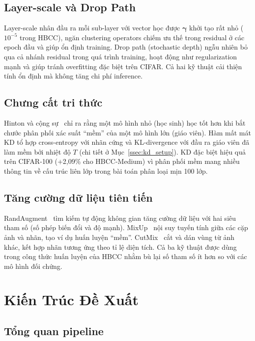 \documentclass[journal]{IEEEtran}
\begin{document}
\subsection{Layer-scale và Drop Path}

Layer-scale nhân đầu ra mỗi sub-layer với vector học được
$\bm{\gamma}$ khởi tạo rất nhỏ ($10^{-5}$ trong HBCC), ngăn
clustering operators chiếm ưu thế trong residual ở các epoch đầu và
giúp ổn định training. Drop path (stochastic depth) ngẫu nhiên bỏ
qua cả nhánh residual trong quá trình training, hoạt động như
regularization mạnh và giúp tránh overfitting đặc biệt trên CIFAR.
Cả hai kỹ thuật cải thiện tính ổn định mà không tăng chi phí
inference.

\subsection{Chưng cất tri thức}

Hinton và cộng sự~\cite{Hinton2015Distillation} chỉ ra rằng một mô
hình nhỏ (học sinh) học tốt hơn khi bắt chước phân phối xác suất
``mềm'' của một mô hình lớn (giáo viên). Hàm mất mát KD tổ hợp
cross-entropy với nhãn cứng và KL-divergence với đầu ra giáo viên đã
làm mềm bởi nhiệt độ $T$ (chi tiết ở Mục~\ref{ssec:kd_setup}).
KD đặc biệt hiệu quả trên CIFAR-100 ($+$2,09\% cho HBCC-Medium) vì
phân phối mềm mang nhiều thông tin về cấu trúc liên lớp trong bài
toán phân loại mịn 100 lớp.

\subsection{Tăng cường dữ liệu tiên tiến}

RandAugment~\cite{Cubuk2020RandAugment} tìm kiếm tự động không gian
tăng cường dữ liệu với hai siêu tham số (số phép biến đổi và độ
mạnh). MixUp~\cite{Zhang2018Mixup} nội suy tuyến tính giữa các cặp
ảnh và nhãn, tạo ví dụ huấn luyện ``mềm''. CutMix~\cite{Yun2019CutMix}
cắt và dán vùng từ ảnh khác, kết hợp nhãn tương ứng theo tỉ lệ diện
tích. Cả ba kỹ thuật được dùng trong công thức huấn luyện của HBCC
nhằm bù lại số tham số ít hơn so với các mô hình đối chứng.

\section{Kiến Trúc Đề Xuất}
\label{sec:arch}

\subsection{Tổng quan pipeline}
\end{document}
